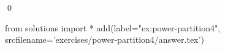 
\begin{ex} 
  \label{ex:power-partition4}
  
  \qed
\end{ex} 
\begin{python0}
from solutions import *
add(label="ex:power-partition4",
    srcfilename='exercises/power-partition4/answer.tex') 
\end{python0}
